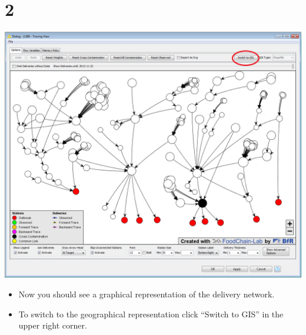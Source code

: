 \documentclass[10pt]{beamer}
\begin{document}
\section{2}
\begin{frame}
	\begin{center}
  		\includegraphics[height=0.6\textheight]{2.png}
	\end{center}
	\begin{itemize}
		\item Now you should see a graphical representation of the delivery network.
		\item To switch to the geographical representation click ``Switch to GIS'' in the upper right corner.
	\end{itemize}
\end{frame}
\end{document}
